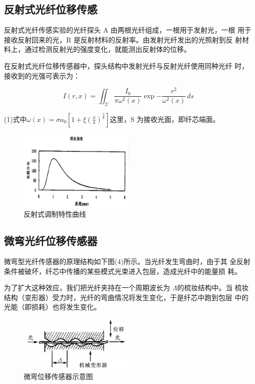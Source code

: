 \documentclass[a4paper,UTF8]{ctexart}
\begin{document}
\subsection{反射式光纤位移传感}

反射式光纤传感实验的光纤探头 A 由两根光纤组成，一根用于发射光，一根
用于接收反射回来的光，R 是反射材料的反射率。由发射光纤发出的光照射到反
射材料上，通过检测反射光的强度变化，就能测出反射体的位移。

在反射式光纤位移传感器中，探头结构中发射光纤与反射光纤使用同种光纤
时，接收到的光强可表示为：

\begin{equation}
    I(r,x) = \iint_{\Sigma} \frac{I_0}{\pi \omega^2(x)} \exp{- \frac{r^2}{\omega^2(x)}} \,ds 
\end{equation}

(1)式中$\omega(x) = \sigma a_0 \left[1+\xi (\frac{x}{a})^{\frac{3}{2}}\right]$这里，S 为接收光面，即纤芯端面。

\begin{figure}[H]
    \centering
    \begin{minipage}[b]{0.9\textwidth}
        \centering
        \includegraphics[width=0.5\textwidth]{./2.png}
        \caption{反射式调制特性曲线}
    \end{minipage}
\end{figure}

\subsection{微弯光纤位移传感器}

微弯型光纤传感器的原理结构如下图(4)所示。当光纤发生弯曲时，由于其
全反射条件被破坏，纤芯中传播的某些模式光束进入包层，造成光纤中的能量损
耗。

为了扩大这种效应，我们把光纤夹持在一个周期波长为
$\Lambda$的梳妆结构中。当
梳妆结构（变形器）受力时，光纤的弯曲情况将发生变化，于是纤芯中跑到包层
中的光能（即损耗）也将发生变化。

\begin{figure}[H]
    \centering
    \begin{minipage}[b]{0.9\textwidth}
        \centering
        \includegraphics[width=0.5\textwidth]{./3.png}
        \caption{微弯位移传感器示意图}
    \end{minipage}
\end{figure}
\end{document}
